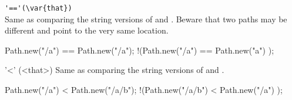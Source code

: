\begin{urbiscriptapi}
\item \lstinline|'=='(\var{that})|\\
  Same as comparing the string versions of \this and
  .  Beware that two paths may be different and point to the
  very same location.
\begin{urbiassert}
  Path.new("/a")  == Path.new("/a");
!(Path.new("/a")  == Path.new("a")  );
\end{urbiassert}

\item['<'](<that>)%
  Same as comparing the string versions of \this and
  .
\begin{urbiassert}
  Path.new("/a")   < Path.new("/a/b");
!(Path.new("/a/b") < Path.new("/a")  );
\end{urbiassert}

\end{urbiscriptapi}


